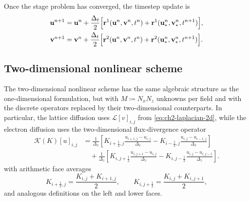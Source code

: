 Once the stage problem has converged, the timestep update is
\begin{subequations}\label{eq:ch2-nonlinear-1d-final}
    \begin{align}
        \mathbf{u}^{n+1}
         & =
        \mathbf{u}^{n}
        +
        \frac{\Delta_t}{2}
        \Bigl[
            \mathbf{r}^{1}(\mathbf{u}^{n},\mathbf{v}^{n},t^{n})
            +
            \mathbf{r}^{1}(\mathbf{u}^{n}_{*},\mathbf{v}^{n}_{*},t^{n+1})
            \Bigr],
        \label{eq:ch2-nonlinear-1d-final-a} \\
        \mathbf{v}^{n+1}
         & =
        \mathbf{v}^{n}
        +
        \frac{\Delta_t}{2}
        \Bigl[
            \mathbf{r}^{2}(\mathbf{u}^{n},\mathbf{v}^{n},t^{n})
            +
            \mathbf{r}^{2}(\mathbf{u}^{n}_{*},\mathbf{v}^{n}_{*},t^{n+1})
            \Bigr].
        \label{eq:ch2-nonlinear-1d-final-b}
    \end{align}
\end{subequations}

\subsection{Two-dimensional nonlinear scheme}
\label{sec:ch2-nonlinear-2d}

The two-dimensional nonlinear scheme has the same algebraic structure as the one-dimensional formulation, but with \(M \coloneqq N_xN_z\) unknowns per field and with the discrete operators replaced by their two-dimensional counterparts. In particular, the lattice diffusion uses \(\mathcal{L}[v]_{i,j}\) from \eqref{eq:ch2-laplacian-2d}, while the electron diffusion uses the two-dimensional flux-divergence operator
\[
    \begin{aligned}
        \mathcal{K}(K)[u]_{i,j}
         & =
        \frac{1}{\Delta_x}
        \left[
        K_{i+\frac{1}{2},j}\frac{u_{i+1,j}-u_{i,j}}{\Delta_x}
        -
        K_{i-\frac{1}{2},j}\frac{u_{i,j}-u_{i-1,j}}{\Delta_x}
        \right]  \\
         & \quad
        +
        \frac{1}{\Delta_z}
        \left[
        K_{i,j+\frac{1}{2}}\frac{u_{i,j+1}-u_{i,j}}{\Delta_z}
        -
        K_{i,j-\frac{1}{2}}\frac{u_{i,j}-u_{i,j-1}}{\Delta_z}
        \right].
    \end{aligned}
\]
with arithmetic face averages
\[
    K_{i+\frac{1}{2},j} = \frac{K_{i,j}+K_{i+1,j}}{2},
    \qquad
    K_{i,j+\frac{1}{2}} = \frac{K_{i,j}+K_{i,j+1}}{2},
\]
and analogous definitions on the left and lower faces.

